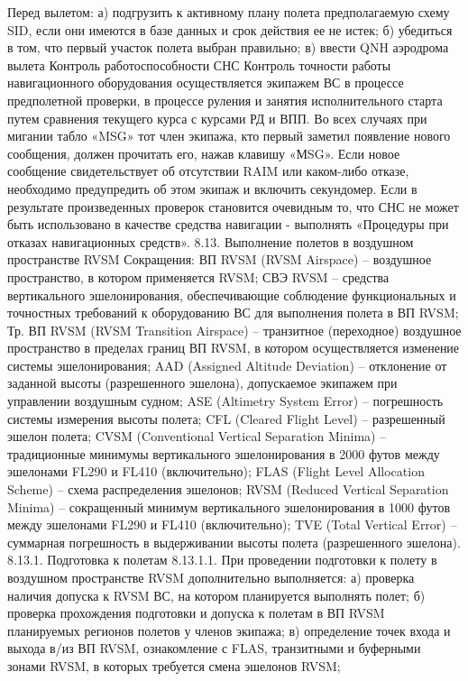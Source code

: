 Перед вылетом:
а)	подгрузить к активному плану полета предполагаемую схему SID, если они имеются в базе данных и срок действия ее не истек;
б)	убедиться в том, что первый участок полета выбран правильно;
в)	ввести QNH аэродрома вылета 
Контроль работоспособности СНС
Контроль точности работы навигационного оборудования осуществляется экипажем ВС в процессе предполетной проверки, в процессе руления и занятия исполнительного старта путем сравнения текущего курса с курсами РД и ВПП.
Во всех случаях при мигании табло «MSG» тот член экипажа, кто первый заметил появление нового сообщения, должен прочитать его, нажав клавишу «МSG». Если новое сообщение свидетельствует об отсутствии RAIM или каком-либо отказе, необходимо предупредить об этом экипаж и включить секундомер. 
Если в результате произведенных проверок становится очевидным то, что СНС не может быть использовано в качестве средства навигации - выполнять «Процедуры при отказах навигационных средств».
8.13.	Выполнение полетов в воздушном пространстве RVSM
Сокращения:
ВП RVSM (RVSM Airspace) – воздушное пространство, в котором применяется RVSM;
СВЭ RVSM – средства вертикального эшелонирования, обеспечивающие соблюдение функциональных и точностных требований к оборудованию ВС для выполнения полета в ВП RVSM;
Тр. ВП RVSM (RVSM Transition Airspace) – транзитное (переходное) воздушное пространство в пределах границ ВП RVSM, в котором осуществляется изменение системы эшелонирования;
AAD (Assigned Altitude Deviation) – отклонение от заданной высоты (разрешенного эшелона), допускаемое экипажем при управлении воздушным судном;
ASE (Altimetry System Error) – погрешность системы измерения высоты полета;
CFL (Cleared Flight Level) – разрешенный эшелон полета;
CVSM (Conventional Vertical Separation Minima) – традиционные минимумы вертикального эшелонирования в 2000 футов между эшелонами FL290 и FL410 (включительно);
FLAS (Flight Level Allocation Scheme) – схема распределения эшелонов;
RVSM (Reduced Vertical Separation Minima) – сокращенный минимум вертикального эшелонирования в 1000 футов между эшелонами FL290 и FL410 (включительно);
TVE (Total Vertical Error) – суммарная погрешность в выдерживании высоты полета (разрешенного эшелона).
8.13.1.	Подготовка к полетам
8.13.1.1. При проведении подготовки к полету в воздушном пространстве RVSM дополнительно выполняется:
а)	проверка наличия допуска к RVSM ВС, на котором планируется выполнять полет;
б)	проверка прохождения подготовки и допуска к полетам в ВП RVSM планируемых регионов полетов у членов экипажа;
в)	определение точек входа и выхода в/из ВП RVSM, ознакомление с FLAS, транзитными и буферными зонами RVSM, в которых требуется смена эшелонов RVSM;
